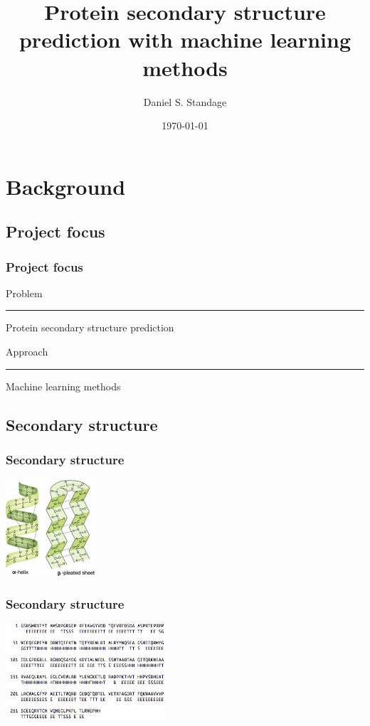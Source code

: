 \documentclass{beamer}
\title[Secondary structure prediction]{Protein secondary structure prediction with machine learning methods}
\author{Daniel S. Standage}
\date{\today}
\institute[BCB 569]{BCB 569}
\begin{document}
 

\begin{frame}
  \titlepage
\end{frame}

\section{Background}
\subsection{Project focus}
\begin{frame}
  \frametitle{Project focus}
  {\LARGE Problem}
  \vspace{1px}
  \hrule
  \vspace{5px}
  Protein secondary structure prediction
  
  \vspace{30px}
  
  {\LARGE Approach}
  \hrule
  \vspace{5px}
  Machine learning methods
\end{frame}

\subsection{Secondary structure}
\begin{frame}
  \frametitle{Secondary structure}
  \begin{center}
    \includegraphics[width=125px]{secondary_structure.jpg}
  \end{center}
\end{frame}
\begin{frame}
  \frametitle{Secondary structure}
  \begin{center}
    \includegraphics[width=225px]{sequence-structure.png}
  \end{center}
\end{frame}
\end{document}
